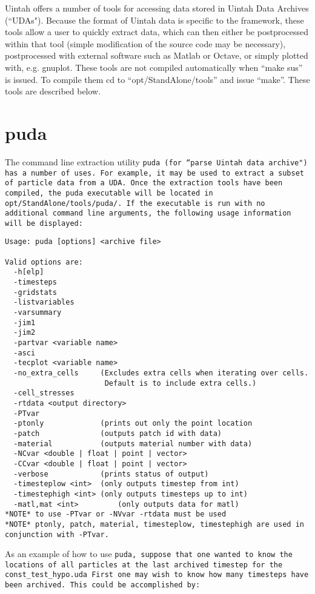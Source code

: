 Uintah offers a number of tools for accessing data stored in Uintah
Data Archives (``UDAs").  Because the format of Uintah data is
specific to the framework, these tools allow a user to quickly extract
data, which can then either be postprocessed within that tool (simple
modification of the source code may be necessary), postprocessed with
external software such as Matlab or Octave, or simply plotted with,
e.g. gnuplot.  These tools are not compiled automatically when ``make
sus'' is issued.  To compile them cd to ``opt/StandAlone/tools'' and
issue ``make''.  These tools are described below.

\section{puda}

The command line extraction utility \tt puda \normalfont (for ``parse
Uintah data archive") has a number of uses.  For example, it may be
used to extract a subset of particle data from a UDA.  Once the
extraction tools have been compiled, the puda executable will be
located in \tt opt/StandAlone/tools/puda/. \normalfont If the
executable is run with no additional command line arguments, the
following usage information will be displayed:

\begin{Verbatim}[fontsize=\footnotesize]
Usage: puda [options] <archive file>

Valid options are:
  -h[elp]
  -timesteps
  -gridstats
  -listvariables
  -varsummary
  -jim1
  -jim2
  -partvar <variable name>
  -asci
  -tecplot <variable name>
  -no_extra_cells     (Excludes extra cells when iterating over cells.
                       Default is to include extra cells.)
  -cell_stresses
  -rtdata <output directory>
  -PTvar
  -ptonly             (prints out only the point location
  -patch              (outputs patch id with data)
  -material           (outputs material number with data)
  -NCvar <double | float | point | vector>
  -CCvar <double | float | point | vector>
  -verbose            (prints status of output)
  -timesteplow <int>  (only outputs timestep from int)
  -timestephigh <int> (only outputs timesteps up to int)
  -matl,mat <int>         (only outputs data for matl)
*NOTE* to use -PTvar or -NVvar -rtdata must be used
*NOTE* ptonly, patch, material, timesteplow, timestephigh are used in conjunction with -PTvar.
\end{Verbatim}

As an example of how to use \tt puda, \normalfont suppose that one
wanted to know the locations of all particles at the last archived
timestep for the \tt const\_test\_hypo.uda \normalfont First one may
wish to know how many timesteps have been archived.  This could be
accomplished by:

